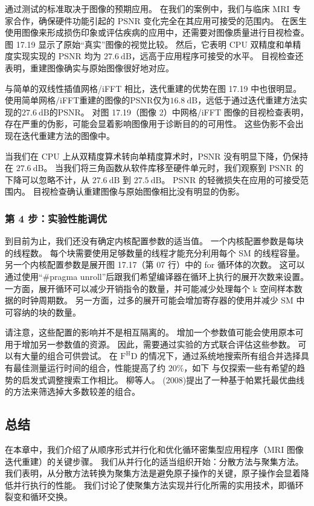 通过测试的标准取决于图像的预期应用。 在我们的案例中，我们与临床 MRI 专家合作，确保硬件功能引起的 PSNR 变化完全在其应用可接受的范围内。 在医生使用图像来形成损伤印象或评估疾病的应用中，还需要对图像质量进行目视检查。 图 17.19 显示了原始“真实”图像的视觉比较。 然后，它表明 CPU 双精度和单精度实现实现的 PSNR 均为 $27.6 \mathrm{~dB}$，远高于应用程序可接受的水平。 目视检查还表明，重建图像确实与原始图像很好地对应。

与简单的双线性插值网格/iFFT 相比，迭代重建的优势在图 17.19 中也很明显。 使用简单网格/iFFT重建的图像的PSNR仅为$16.8 \mathrm{~dB}$，远低于通过迭代重建方法实现的$27.6 \mathrm{~dB}$的PSNR。 对图 17.19（图像 2）中网格/iFFT 图像的目视检查表明，存在严重的伪影，可能会显着影响图像用于诊断目的的可用性。 这些伪影不会出现在迭代重建方法的图像中。

当我们在 CPU 上从双精度算术转向单精度算术时，PSNR 没有明显下降，仍保持在 $27.6 \mathrm{~dB}$。 当我们将三角函数从软件库移至硬件单元时，我们观察到 PSNR 的下降可以忽略不计，从 $27.6 \mathrm{~dB}$ 到 $27.5 \mathrm{~dB}$。 PSNR 的轻微损失在应用的可接受范围内。 目视检查确认重建图像与原始图像相比没有明显的伪影。

\subsubsection{第 4 步：实验性能调优}
到目前为止，我们还没有确定内核配置参数的适当值。 一个内核配置参数是每块的线程数。 每个块需要使用足够数量的线程才能充分利用每个 SM 的线程容量。 另一个内核配置参数是展开图 17.17（第 07 行）中的 for 循环体的次数。 这可以通过使用“\#pragma unroll”后跟我们希望编译器在循环上执行的展开次数来设置。 一方面，展开循环可以减少开销指令的数量，并可能减少处理每个 k 空间样本数据的时钟周期数。 另一方面，过多的展开可能会增加寄存器的使用并减少 SM 中可容纳的块的数量。

请注意，这些配置的影响并不是相互隔离的。 增加一个参数值可能会使用原本可用于增加另一参数值的资源。 因此，需要通过实验的方式联合评估这些参数。 可以有大量的组合可供尝试。 在 $\mathrm{F}^{\mathrm{H}} \mathrm{D}$ 的情况下，通过系统地搜索所有组合并选择具有最佳测量运行时间的组合，性能提高了约 $20 \%$，如下 与仅探索一些有希望的趋势的启发式调整搜索工作相比。 柳等人。 (2008)提出了一种基于帕累托最优曲线的方法来筛选掉大多数较差的组合。

\subsection{总结}
在本章中，我们介绍了从顺序形式并行化和优化循环密集型应用程序（MRI 图像迭代重建）的关键步骤。 我们从并行化的适当组织开始：分散方法与聚集方法。 我们表明，从分散方法转换为聚集方法是避免原子操作的关键，原子操作会显着降低并行执行的性能。 我们讨论了使聚集方法实现并行化所需的实用技术，即循环裂变和循环交换。

